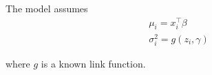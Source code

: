 \documentclass[article]{jss}
\begin{document}
The model assumes
\begin{gather}
\mu_i = x_i^\top \beta \\
\sigma_i^2 = g(z_i, \gamma)
\end{gather}

where $g$ is a known link function.
\end{document}
